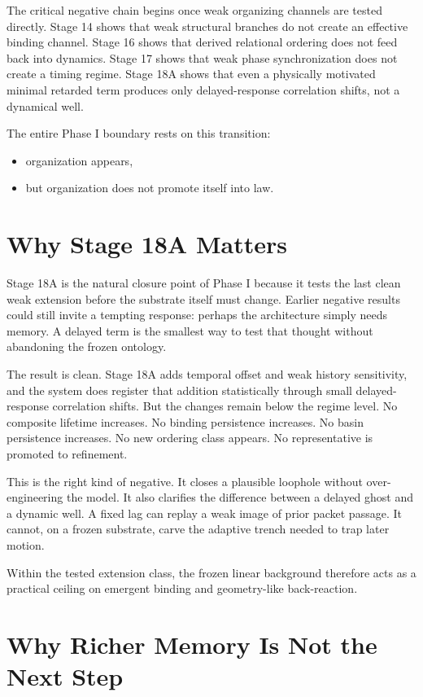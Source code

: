 \documentclass[11pt]{article}
\begin{document}
The critical negative chain begins once weak organizing channels are tested directly. Stage 14 shows that weak structural branches do not create an effective binding channel. Stage 16 shows that derived relational ordering does not feed back into dynamics. Stage 17 shows that weak phase synchronization does not create a timing regime. Stage 18A shows that even a physically motivated minimal retarded term produces only delayed-response correlation shifts, not a dynamical well.

The entire Phase I boundary rests on this transition:
\begin{itemize}
\item organization appears,
\item but organization does not promote itself into law.
\end{itemize}

\section{Why Stage 18A Matters}

Stage 18A is the natural closure point of Phase I because it tests the last clean weak extension before the substrate itself must change. Earlier negative results could still invite a tempting response: perhaps the architecture simply needs memory. A delayed term is the smallest way to test that thought without abandoning the frozen ontology.

The result is clean. Stage 18A adds temporal offset and weak history sensitivity, and the system does register that addition statistically through small delayed-response correlation shifts. But the changes remain below the regime level. No composite lifetime increases. No binding persistence increases. No basin persistence increases. No new ordering class appears. No representative is promoted to refinement.

This is the right kind of negative. It closes a plausible loophole without over-engineering the model. It also clarifies the difference between a delayed ghost and a dynamic well. A fixed lag can replay a weak image of prior packet passage. It cannot, on a frozen substrate, carve the adaptive trench needed to trap later motion.

Within the tested extension class, the frozen linear background therefore acts as a practical ceiling on emergent binding and geometry-like back-reaction.

\section{Why Richer Memory Is Not the Next Step}
\end{document}
